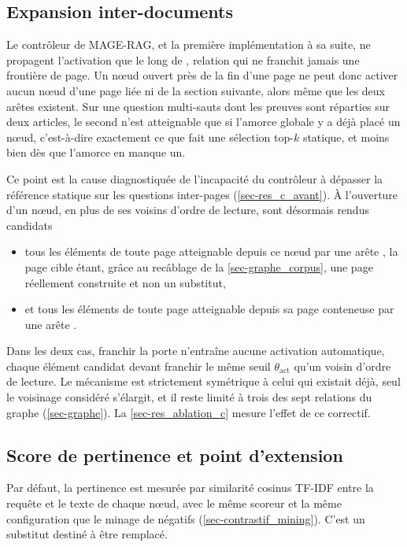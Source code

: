 \subsection{Expansion inter-documents}
\label{sec-controleur_expansion}
 
Le contrôleur de MAGE-RAG, et la première implémentation à sa suite, ne propagent
l'activation que le long de , relation qui ne franchit
jamais une frontière de page. Un nœud ouvert près de la fin d'une page ne peut
donc activer aucun nœud d'une page liée ni de la section suivante, alors même que
les deux arêtes existent. Sur une question multi-sauts dont les preuves sont
réparties sur deux articles, le second n'est atteignable que si l'amorce globale
y a déjà placé un nœud, c'est-à-dire exactement ce que fait une sélection top-$k$
statique, et moins bien dès que l'amorce en manque un.
 
Ce point est la cause diagnostiquée de l'incapacité du contrôleur à dépasser la
référence statique sur les questions inter-pages (\cref{sec-res_c_avant}). À
l'ouverture d'un nœud, en plus de ses voisins d'ordre de lecture, sont désormais
rendus candidats
 
\begin{itemize}
\item tous les éléments de toute page atteignable depuis ce nœud par une arête
, la page cible étant, grâce au recâblage de la
\cref{sec-graphe_corpus}, une page réellement construite et non un substitut,
\item et tous les éléments de toute page atteignable depuis sa page conteneuse
par une arête .
\end{itemize}
 
Dans les deux cas, franchir la porte n'entraîne aucune activation automatique,
chaque élément candidat devant franchir le même seuil $\theta_{\text{act}}$ qu'un
voisin d'ordre de lecture. Le mécanisme est strictement symétrique à celui qui
existait déjà, seul le voisinage considéré s'élargit, et il reste limité à trois
des sept relations du graphe (\cref{sec-graphe}). La \cref{sec-res_ablation_c}
mesure l'effet de ce correctif.
 
\subsection{Score de pertinence et point d'extension}
\label{sec-controleur_scoreur}
 
Par défaut, la pertinence est mesurée par similarité cosinus TF-IDF entre la
requête et le texte de chaque nœud, avec le même scoreur et la même configuration
que le minage de négatifs (\cref{sec-contrastif_mining}). C'est un substitut
destiné à être remplacé.
 
